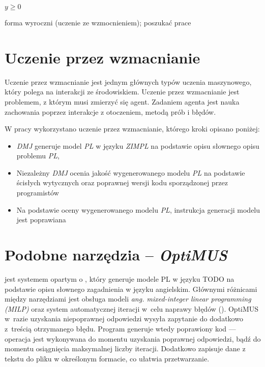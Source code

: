     $y \geq 0$

forma wyroczni (uczenie ze wzmocnieniem); poszukać prace

\section{Uczenie przez wzmacnianie}
Uczenie przez wzmacnianie jest jednym głównych typów uczenia maszynowego, który polega na interakcji ze środowiskiem. Uczenie przez wzmacnianie jest problemem, z którym musi zmierzyć się agent. Zadaniem agenta jest nauka zachowania poprzez interakcje z otoczeniem, metodą prób i błędów.\cite{kaelbling1996reinforcement}

W pracy wykorzystano uczenie przez wzmacnianie, którego kroki opisano poniżej:
\begin{itemize}
    \item \textit{DMJ} generuje model \textit{PL} w języku \textit{ZIMPL} na podstawie opisu słownego opisu problemu \textit{PL},
    \item Niezależny \textit{DMJ} ocenia jakość wygenerowanego modelu \textit{PL} na podstawie ścisłych wytycznych oraz poprawnej wersji kodu sporządzonej przez programistów
    \item Na podstawie oceny wygenerowanego modelu \textit{PL}, instrukcja generacji modelu jest poprawiana
\end{itemize}

\section{Podobne narzędzia -- \textit{OptiMUS}} \label{sec:optimus}

 \cite{ahmaditeshnizi2023optimus} jest systemem opartym o , który generuje modele PL w języku TODO na podstawie opisu słownego zagadnienia w języku angielskim. %
Głównymi różnicami między narzędziami jest obsługa modeli \textit{ang. mixed-integer linear programming (MILP)} oraz system automatycznej iteracji w~celu naprawy błędów (). %
OptiMUS w~razie uzyskania niepoprawnej odpowiedzi wysyła zapytanie do  dodatkowo z~treścią otrzymanego błędu. %
Program generuje wtedy poprawiony kod --- operacja jest wykonywana do momentu uzyskania poprawnej odpowiedzi, bądź do momentu osiągnięcia maksymalnej liczby iteracji. Dodatkowo  zapisuje dane z tekstu do pliku w określonym formacie, co ułatwia przetwarzanie. %




